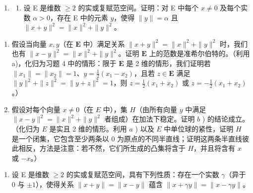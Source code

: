 \begin{enumerate}
\def\labelenumi{\arabic{enumi})}
\setcounter{enumi}{5}
\tightlist
\item
  \begin{enumerate}
  \def\labelenumii{\alph{enumii})}
  \tightlist
  \item
    设 E 是维数 \(\geqslant 2\) 的实或复赋范空间。证明：对 E 中每个 \(x \neq 0\) 及每个实数 \(\alpha > 0\)，存在 E 中的元素 \(y\)，使得 \(\| y \| = \alpha\) 且 \(\| x + y \|^2 = \| x \|^2 + \| y \|^2\)。
  \end{enumerate}
\end{enumerate}

\begin{enumerate}
\def\labelenumi{\alph{enumi})}
\setcounter{enumi}{1}
\item
  假设当向量 \(x, y\)（在 \(\mathbf{E}\) 中）满足关系 \(\| x + y\|^2 = \| x\|^2 + \| y\|^2\) 时，我们也有 \(\| x - y\|^2 = \| x\|^2 + \| y\|^2\)。证明 \(\mathbf{E}\) 上的范数是准希尔伯特的。（利用 a)，化归为习题 4 中的情形：限于 \(\mathbf{E}\) 是 2 维的情形，我们证明若 \(\| x_1\| = \| x_2\| = 1\)、\(y = \frac{1}{2}(x_1 - x_2)\)，且若 \(z \in \mathbf{E}\) 满足 \(\| y\|^2 + \| z\|^2 = \| y + z\|^2 = 1\)，则 \(z = \frac{1}{2}(x_1 + x_2)\) 或 \(z = -\frac{1}{2}(x_1 + x_2)\)。）
\item
  假设对每个向量 \(x \neq 0\)（在 \(E\) 中），集 \(H\)（由所有向量 \(y\) 中满足 \(\| x - y \|^2 = \| x \|^2 + \| y \|^2\) 者组成）在加法下稳定。证明 \(b\) ) 的结论成立。（化归为 \(E\) 是实且 2 维的情形。利用 \(a\) ) 以及 \(E\) 中单位球的紧性，证明 \(H\) 是一个闭集，它包含至少两条以 0 为原点的不同半直线；证明这两条半直线彼此相反，方法是注意：若不然，它们所生成的凸集将含于 \(H\)，并且将含有 \(x\) 或 \(-x\)。）
\end{enumerate}

\begin{enumerate}
\def\labelenumi{\arabic{enumi})}
\setcounter{enumi}{6}
\tightlist
\item
  设 E 是维数 \(\geqslant 2\) 的实或复赋范空间，具有下列性质：存在一个实数 \(\gamma\)（异于 0 与 \(\pm 1\)），使得关系 \(\| x + y \| = \| x - y \|\) 蕴含 \(\| x + \gamma y \| = \| x - \gamma y \|\)。
\end{enumerate}

